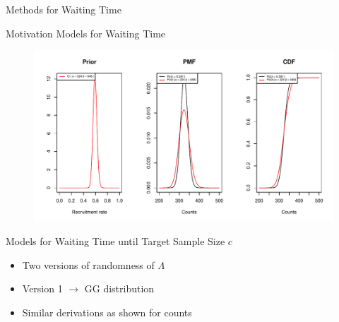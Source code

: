 \documentclass[english]{beamer}\usepackage[]{graphicx}\usepackage[]{xcolor}
\makeatletter
\def\maxwidth{ %
  \ifdim\Gin@nat@width>\linewidth
    \linewidth
  \else
    \Gin@nat@width
  \fi
}
\newenvironment{knitrout}{}{} %
\makeatother
\begin{document}
\begin{frame}{Methods for Waiting Time}

\end{frame}

\begin{frame}{Motivation Models for Waiting Time}
\begin{figure}
\centering
\begin{knitrout}
\color{fgcolor}
\includegraphics[width=\maxwidth]{figures/figunnamed-chunk-11-1} 
\end{knitrout}

\end{figure}
\end{frame}

\begin{frame}{Models for Waiting Time until Target Sample Size $c$}
\begin{table}[h!]
\centering
{}
\end{table}

\begin{itemize}[label = ]
\item Two versions of randomness of $\Lambda$
\item Version 1 $\rightarrow$ GG distribution 
\item Similar derivations as shown for counts
\end{itemize}
\end{frame}
\end{document}
